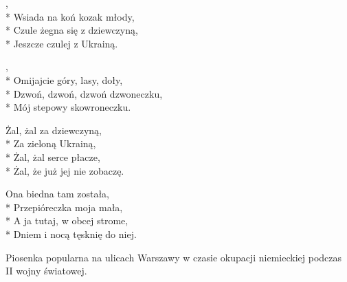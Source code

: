 \begin{lyrics}[longestline={Hej, tam gdzieś znad czarnej wody,}]

,\\*
Wsiada na koń kozak młody,\\*
Czule żegna się z dziewczyną,\\*
Jeszcze czulej z Ukrainą.

\begin{chorus}
,\\*
Omijajcie góry, lasy, doły,\\*
Dzwoń, dzwoń, dzwoń dzwoneczku,\\*
Mój stepowy skowroneczku.
\end{chorus}

Żal, żal za dziewczyną,\\*
Za zieloną Ukrainą,\\*
Żal, żal serce płacze,\\*
Żal, że już jej nie zobaczę.

\chorusref

Ona biedna tam została,\\*
Przepióreczka moja mała,\\*
A ja tutaj, w obcej strome,\\*
Dniem i nocą tęsknię do niej.

\chorusref
\end{lyrics}



\begin{info}Piosenka popularna na ulicach Warszawy w czasie okupacji niemieckiej podczas II wojny światowej.\end{info}

